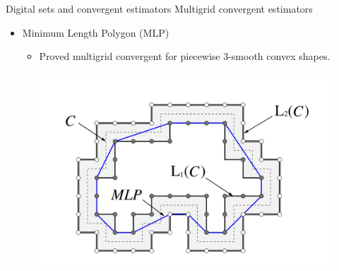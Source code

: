 
 \begin{frame}
	{Digital sets and convergent estimators}	
	{Multigrid convergent estimators}	
%
	\begin{itemize}
        \item{Minimum Length Polygon (MLP)~}
		\begin{itemize}
			\item{Proved multigrid convergent for piecewise $3$-smooth convex shapes.}
		\end{itemize}	
	\end{itemize}
	
	\begin{figure}
	\includegraphics[scale=1]{figures/motivation/digital-geometric-estimators/mlp.png}	
	\end{figure}	
	
      \end{frame}

